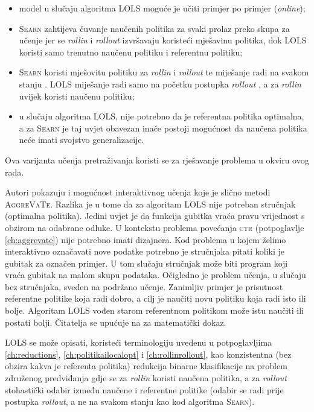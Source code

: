 \begin{itemize}
  \item model u slučaju algoritma \textsc{LOLS} moguće je učiti primjer po
  primjer (\textit{online});

  \item \textsc{Searn} zahtijeva čuvanje naučenih politika za svaki prolaz preko
  skupa za učenje jer se \emph{rollin} i \emph{rollout} izvršavaju koristeći
  mješavinu politika, dok \textsc{LOLS} koristi samo trenutno naučenu politiku i
  referentnu politiku;

  \item \textsc{Searn} koristi mješovitu politiku za \emph{rollin} i
  \emph{rollout} te miješanje radi na svakom stanju .
  \textsc{LOLS} miješanje radi samo na početku postupka \emph{rollout}
  , a za \emph{rollin} uvijek koristi naučenu politiku;

  \item u slučaju algoritma \textsc{LOLS}, nije potrebno da je referentna politika
  optimalna, a za \textsc{Searn} je taj uvjet obavezan inače postoji mogućnost
  da naučena politika neće imati svojstvo generalizacije.

\end{itemize}

\noindent
Ova varijanta učenja pretraživanja koristi se za rješavanje problema u okviru
ovog rada.

Autori pokazuju i mogućnost interaktivnog učenja koje je slično metodi
\textsc{AggreVaTe}. Razlika je u tome da za algoritam \textsc{LOLS} nije
potreban stručnjak (optimalna politika). Jedini uvjet je da funkcija gubitka vraća
pravu vrijednost s obzirom na odabrane odluke. U kontekstu problema povećanja
\textsc{ctr} (potpoglavlje \ref{ch:aggrevate}) nije potrebno imati dizajnera.
Kod problema u kojem želimo interaktivno označavati nove podatke potrebno je
stručnjaka pitati koliki je gubitak za označen primjer. U tom slučaju stručnjak
može biti program koji vraća gubitak na malom skupu podataka. Očigledno je
problem učenja, u slučaju bez stručnjaka, sveden na podržano učenje. Zanimljiv
primjer je prisutnost referentne politike koja radi dobro, a cilj je naučiti novu
politiku koja radi isto ili bolje. Algoritam \textsc{LOLS} vođen starom
referentnom politikom može istu naučiti ili postati bolji. Čitatelja se upućuje na
\cite{daume15lols} za matematički dokaz.

\textsc{LOLS} se može opisati, koristeći terminologiju uvedenu u potpoglavljima
\ref{ch:reductions}, \ref{ch:politikailocalopt} i \ref{ch:rollinrollout}, kao
konzistentna (bez obzira kakva je referenta politika) redukcija binarne
klasifikacije na problem združenog predviđanja gdje se za \textit{rollin}
koristi naučena politika, a za \textit{rollout} stohastički odabir između naučene
i referentne politike (odabir se radi prije postupka \textit{rollout}, a ne na
svakom stanju kao kod algoritma \textsc{Searn}).
